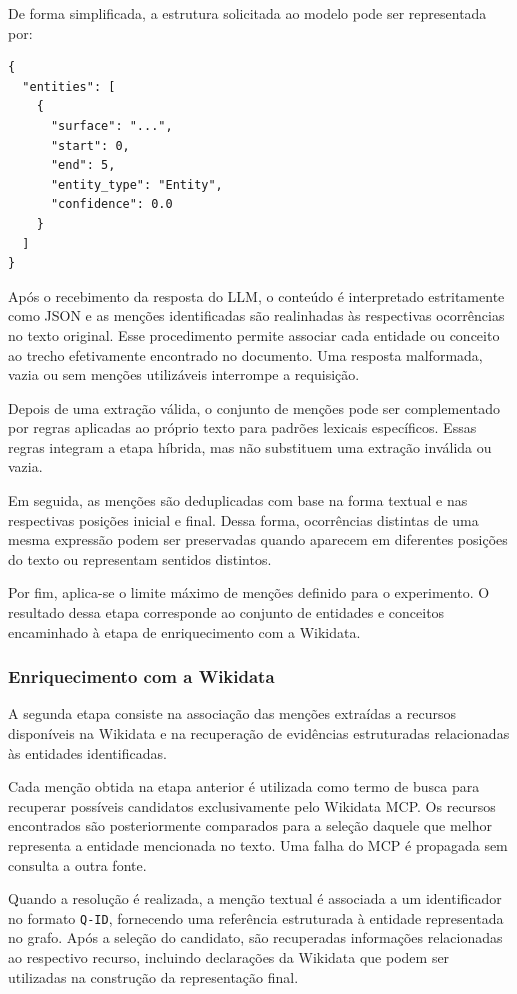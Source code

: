 De forma simplificada, a estrutura solicitada ao modelo pode ser representada por:

\begin{verbatim}
{
  "entities": [
    {
      "surface": "...",
      "start": 0,
      "end": 5,
      "entity_type": "Entity",
      "confidence": 0.0
    }
  ]
}
\end{verbatim}

Após o recebimento da resposta do LLM, o conteúdo é interpretado estritamente como JSON e as menções identificadas são realinhadas às respectivas ocorrências no texto original. Esse procedimento permite associar cada entidade ou conceito ao trecho efetivamente encontrado no documento. Uma resposta malformada, vazia ou sem menções utilizáveis interrompe a requisição.

Depois de uma extração válida, o conjunto de menções pode ser complementado por regras aplicadas ao próprio texto para padrões lexicais específicos. Essas regras integram a etapa híbrida, mas não substituem uma extração inválida ou vazia.

Em seguida, as menções são deduplicadas com base na forma textual e nas respectivas posições inicial e final. Dessa forma, ocorrências distintas de uma mesma expressão podem ser preservadas quando aparecem em diferentes posições do texto ou representam sentidos distintos.

Por fim, aplica-se o limite máximo de menções definido para o experimento. O resultado dessa etapa corresponde ao conjunto de entidades e conceitos encaminhado à etapa de enriquecimento com a Wikidata.


\subsubsection{Enriquecimento com a Wikidata}

A segunda etapa consiste na associação das menções extraídas a recursos disponíveis na Wikidata e na recuperação de evidências estruturadas relacionadas às entidades identificadas.

Cada menção obtida na etapa anterior é utilizada como termo de busca para recuperar possíveis candidatos exclusivamente pelo Wikidata MCP. Os recursos encontrados são posteriormente comparados para a seleção daquele que melhor representa a entidade mencionada no texto. Uma falha do MCP é propagada sem consulta a outra fonte.

Quando a resolução é realizada, a menção textual é associada a um identificador no formato \texttt{Q-ID}, fornecendo uma referência estruturada à entidade representada no grafo. Após a seleção do candidato, são recuperadas informações relacionadas ao respectivo recurso, incluindo declarações da Wikidata que podem ser utilizadas na construção da representação final.

